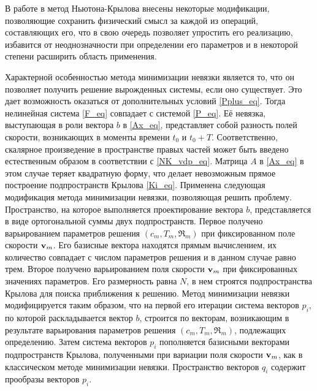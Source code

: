 В работе в метод Ньютона-Крылова внесены некоторые модификации, позволяющие сохранить физический смысл за каждой из операций, составляющих его, что в свою очередь позволяет упростить его реализацию, избавится от неоднозначности при определении его параметров и в некоторой степени расширить область применения. 

Характерной особенностью метода минимизации невязки является то, что он позволяет получить решение вырожденных системы, если оно существует. Это дает возможность оказаться от дополнительных условий \eqref{Pplus_eq}. Тогда нелинейная система \eqref{F_eq} совпадает с системой \eqref{P_eq}. Её невязка, выступающая в роли вектора $b$ в \eqref{Ax_eq}, представляет собой разность полей скорости, возникающих в моменты времени $t_0$ и $t_0 + T$. Соответственно, скалярное произведение в пространстве правых частей может быть введено естественным образом в соответствии с \eqref{NK_vdp_eq}. Матрица $A$ в \eqref{Ax_eq} в этом случае теряет квадратную форму, что делает невозможным прямое построение подпространств Крылова \eqref{Ki_eq}. Применена следующая модификация метода минимизации невязки, позволяющая решить проблему. Пространство, на которое выполняется проектирование вектора $b$, представляется в виде ортогональной суммы двух подпространств. Первое получено варьированием параметров решения $(c_m, T_m, \Re_m)$ при фиксированном поле скорости $\mathbf{v}_m$. Его базисные вектора находятся прямым вычислением, их количество совпадает с числом параметров решения и в данном случае равно трем. Второе получено варьированием поля скорости $\mathbf{v}_m$ при фиксированных значениях параметров. Его размерность равна $N$, в нем строятся подпространства Крылова для поиска приближения к решению. Метод минимизации невязки модифицируется таким образом, что на первой его итерации система векторов $p_i$, по которой раскладывается вектор $b$, строится по векторам, возникающим в результате варьирования параметров решения $(c_m, T_m, \Re_m)$, подлежащих определению.  Затем система векторов $p_i$ пополняется базисными векторами подпространств Крылова, полученными при вариации поля скорости $\mathbf{v}_m$, как в классическом методе минимизации невязки. Пространство векторов $q_i$ содержит прообразы векторов $p_i$.

